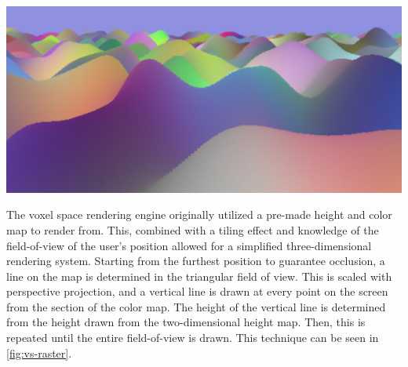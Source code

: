 \documentclass[10pt]{report}
\begin{document}
		\begin{minipage}{\textwidth}
			\centering
			\includegraphics[scale=.15]{proc-voxel}
			\label{fig:pnvs}
		\end{minipage}
		
		The voxel space rendering engine originally utilized a pre-made height and color map to render from. This, combined with a tiling effect and knowledge of the field-of-view of the user's position allowed for a simplified three-dimensional rendering system. Starting from the furthest position to guarantee occlusion, a line on the map is determined in the triangular field of view. This is scaled with perspective projection, and a vertical line is drawn at every point on the screen from the section of the color map. The height of the vertical line is determined from the height drawn from the two-dimensional height map. Then, this is repeated until the entire field-of-view is drawn. This technique can be seen in \autoref{fig:vs-raster}. 
		
\end{document}
